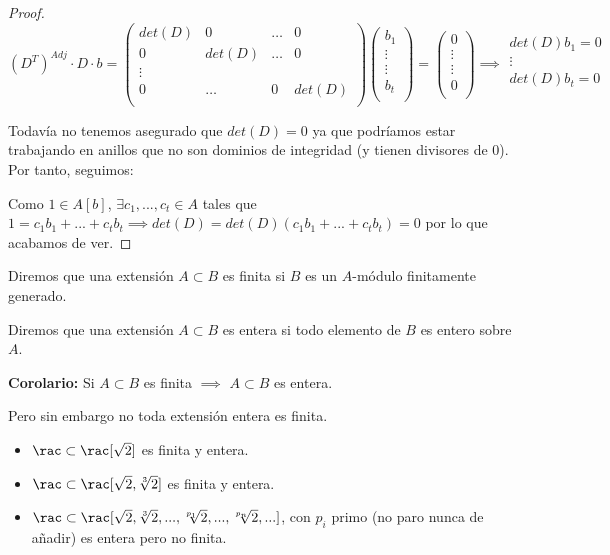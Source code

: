 \begin{proof}
	$$ (D^T)^{Adj}\cdot D \cdot b = \left( \begin{array}{cccc}
	det(D) & 0 & \dots & 0 \\
	0 & det(D) & \dots & 0 \\
	\vdots &  & &  \\
	0 & \dots & 0 & det(D)\\
	\end{array}
	\right) \left( \begin{array}{c}
	b_1 \\
	\vdots \\
	\vdots \\
	b_t\\
	\end{array}
	\right) =
	\left( \begin{array}{c}
	0 \\
	\vdots\\
	\vdots \\
	0\\
	\end{array}
	\right) \implies 
	\begin{array}{c}
	det(D)b_1=0 \\
	\vdots\\
	det(D)b_t=0\\
	\end{array}
$$

Todavía no tenemos asegurado que $det(D)=0$ ya que podríamos estar trabajando en anillos que no son dominios de integridad (y tienen divisores de 0). Por tanto, seguimos:
	 
	 Como $1 \in A[b]$, $\exists c_1,...,c_t \in A$ tales que $1=c_1b_1+...+c_tb_t \implies det(D)=det(D)(c_1b_1+...+c_tb_t)=0$ por lo que acabamos de ver.
\end{proof}

\begin{defn}
	Diremos que una extensión $A \subset B$ es finita si $B$ es un $A$-módulo finitamente generado.
\end{defn}

\begin{defn}
	Diremos que una extensión $A \subset B$ es entera si todo elemento de $B$ es entero sobre $A$.
\end{defn}

\textbf{Corolario:} Si $A\subset B$ es finita $\implies$ $A \subset B$ es entera.

Pero sin embargo no toda extensión entera es finita.
\begin{example}
	\begin{itemize}
		\item $\rac \subset \rac[\sqrt{2}]$ es finita y entera.
		\item $\rac \subset \rac[\sqrt{2}, \sqrt[3]{2}]$ es finita y entera.
		\item $\rac \subset \rac[\sqrt{2}, \sqrt[3]{2},..., \sqrt[p_1]{2},...,\sqrt[p_n]{2},...]$, con $p_i$ primo (no paro nunca de añadir) es entera pero no finita.
	\end{itemize}
\end{example}

